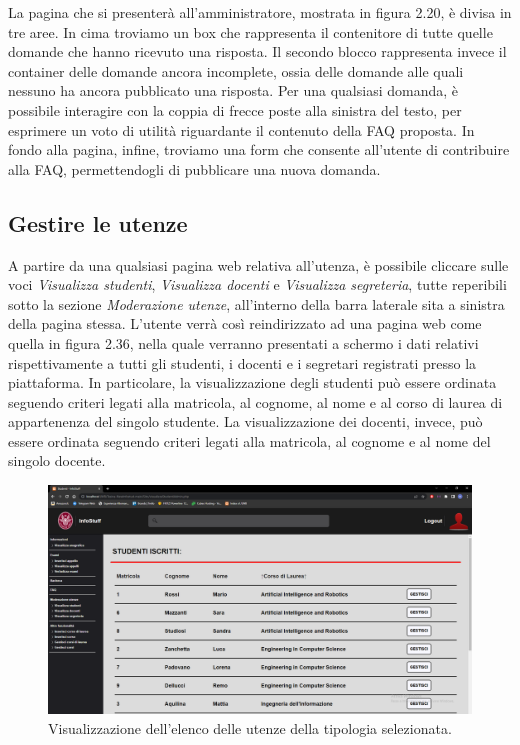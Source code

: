 \documentclass [a4paper,11pt]{book}
\begin{document}
La pagina che si presenterà all'amministratore, mostrata in figura 2.20, è divisa in tre aree. In cima troviamo un box che rappresenta il contenitore di tutte quelle domande che hanno ricevuto una risposta. Il secondo blocco rappresenta invece il container delle domande ancora incomplete, ossia delle domande alle quali nessuno ha ancora pubblicato una risposta. Per una qualsiasi domanda, è possibile interagire con la coppia di frecce poste alla sinistra del testo, per esprimere un voto di utilità riguardante il contenuto della FAQ proposta. In fondo alla pagina, infine, troviamo una form che consente all'utente di contribuire alla FAQ, permettendogli di pubblicare una nuova domanda. 

\medskip

\subsection{Gestire le utenze}	

A partire da una qualsiasi pagina web relativa all'utenza, è possibile cliccare sulle voci \emph{Visualizza studenti}, \emph{Visualizza docenti} e \emph{Visualizza segreteria}, tutte reperibili sotto la sezione \emph{Moderazione utenze}, all'interno della barra laterale sita a sinistra della pagina stessa. L'utente verrà così reindirizzato ad una pagina web come quella in figura 2.36, nella quale verranno presentati a schermo i dati relativi rispettivamente a tutti gli studenti, i docenti e i segretari registrati presso la piattaforma. In particolare, la visualizzazione degli studenti può essere ordinata seguendo criteri legati alla matricola, al cognome, al nome e al corso di laurea di appartenenza del singolo studente. La visualizzazione dei docenti, invece, può essere ordinata seguendo criteri legati alla matricola, al cognome e al nome del singolo docente.

\begin{figure}
\centering
\includegraphics[scale=0.3]{figura2-36.png}
\caption{Visualizzazione dell'elenco delle utenze della tipologia selezionata.}
\end{figure}
\end{document}
